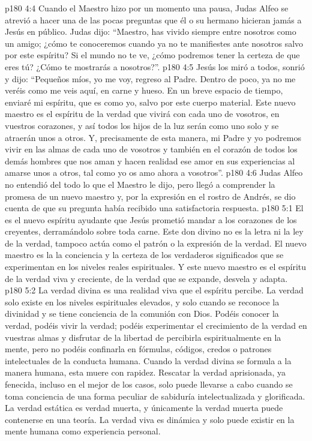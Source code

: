 \vs p180 4:4 Cuando el Maestro hizo por un momento una pausa, Judas Alfeo se atrevió a hacer una de las pocas preguntas que él o su hermano hicieran jamás a Jesús en público. Judas dijo: “Maestro, has vivido siempre entre nosotros como un amigo; ¿cómo te conoceremos cuando ya no te manifiestes ante nosotros salvo por este espíritu? Si el mundo no te ve, ¿cómo podremos tener la certeza de que eres tú? ¿Cómo te mostrarás a nosotros?”.
\vs p180 4:5 Jesús los miró a todos, sonrió y dijo: “Pequeños míos, yo me voy, regreso al Padre. Dentro de poco, ya no me veréis como me veis aquí, en carne y hueso. En un breve espacio de tiempo, enviaré mi espíritu, que es como yo, salvo por este cuerpo material. Este nuevo maestro es el espíritu de la verdad que vivirá con cada uno de vosotros, en vuestros corazones, y así todos los hijos de la luz serán como uno solo y se atraerán unos a otros. Y, precisamente de esta manera, mi Padre y yo podremos vivir en las almas de cada uno de vosotros y también en el corazón de todos los demás hombres que nos aman y hacen realidad ese amor en sus experiencias al amarse unos a otros, tal como yo os amo ahora a vosotros”.
\vs p180 4:6 Judas Alfeo no entendió del todo lo que el Maestro le dijo, pero llegó a comprender la promesa de un nuevo maestro y, por la expresión en el rostro de Andrés, se dio cuenta de que su pregunta había recibido una satisfactoria respuesta.
\vs p180 5:1 El  es el nuevo espíritu ayudante que Jesús prometió mandar a los corazones de los creyentes, derramándolo sobre toda carne. Este don divino no es la letra ni la ley de la verdad, tampoco actúa como el patrón o la expresión de la verdad. El nuevo maestro es la  la conciencia y la certeza de los verdaderos significados que se experimentan en los niveles reales espirituales. Y este nuevo maestro es el espíritu de la verdad viva y creciente, de la verdad que se expande, desvela y adapta.
\vs p180 5:2 La verdad divina es una realidad viva que el espíritu percibe. La verdad solo existe en los niveles espirituales elevados, y solo cuando se reconoce la divinidad y se tiene conciencia de la comunión con Dios. Podéis conocer la verdad, podéis vivir la verdad; podéis experimentar el crecimiento de la verdad en vuestras almas y disfrutar de la libertad de percibirla espiritualmente en la mente, pero no podéis confinarla en fórmulas, códigos, credos o patrones intelectuales de la conducta humana. Cuando la verdad divina se formula a la manera humana, esta muere con rapidez. Rescatar la verdad aprisionada, ya fenecida, incluso en el mejor de los casos, solo puede llevarse a cabo cuando se toma conciencia de una forma peculiar de sabiduría intelectualizada y glorificada. La verdad estática es verdad muerta, y únicamente la verdad muerta puede contenerse en una teoría. La verdad viva es dinámica y solo puede existir en la mente humana como experiencia personal.

